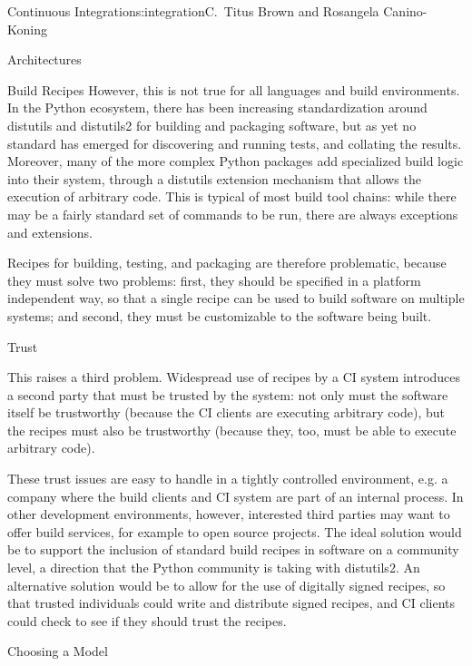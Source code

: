 \begin{aosachapter}{Continuous Integration}{s:integration}{C.\ Titus Brown and Rosangela Canino-Koning}
\begin{aosasect1}{Architectures}
\begin{aosasect2}{Build Recipes}
However, this is not true for all languages and build environments. In
the Python ecosystem, there has been increasing standardization around
distutils and distutils2 for building and packaging software, but as
yet no standard has emerged for discovering and running tests, and
collating the results. Moreover, many of the more complex Python
packages add specialized build logic into their system, through a
distutils extension mechanism that allows the execution of arbitrary
code. This is typical of most build tool chains: while there may be a
fairly standard set of commands to be run, there are always exceptions
and extensions.

Recipes for building, testing, and packaging are therefore
problematic, because they must solve two problems: first, they should
be specified in a platform independent way, so that a single recipe
can be used to build software on multiple systems; and second, they
must be customizable to the software being built.

\end{aosasect2}

\begin{aosasect2}{Trust}

This raises a third problem.  Widespread use of recipes by a CI system
introduces a second party that must be trusted by the system: not only
must the software itself be trustworthy (because the CI clients are
executing arbitrary code), but the recipes must also be trustworthy
(because they, too, must be able to execute arbitrary code).

These trust issues are easy to handle in a tightly controlled
environment, e.g. a company where the build clients and CI system are
part of an internal process. In other development environments,
however, interested third parties may want to offer build services,
for example to open source projects. The ideal solution would be to
support the inclusion of standard build recipes in software on a
community level, a direction that the Python community is taking with
distutils2. An alternative solution would be to allow for the use of
digitally signed recipes, so that trusted individuals could write and
distribute signed recipes, and CI clients could check to see if they
should trust the recipes.

\end{aosasect2}

\begin{aosasect2}{Choosing a Model}


\end{aosasect2}
\end{aosasect1}
\end{aosachapter}
